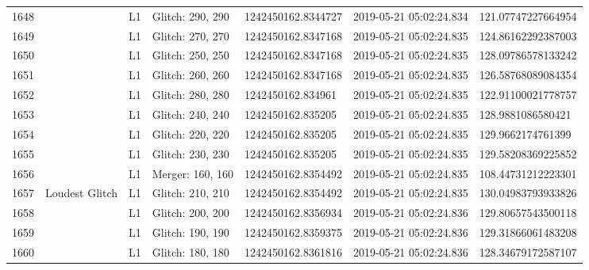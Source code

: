 \begin{longtable}{lllllll}
1648 &                                                    &       L1 &  Glitch: 290, 290 &  1242450162.8344727 &  2019-05-21 05:02:24.834 &  121.07747227664954 \\
1649 &                                                    &       L1 &  Glitch: 270, 270 &  1242450162.8347168 &  2019-05-21 05:02:24.835 &  124.86162292387003 \\
1650 &                                                    &       L1 &  Glitch: 250, 250 &  1242450162.8347168 &  2019-05-21 05:02:24.835 &  128.09786578133242 \\
1651 &                                                    &       L1 &  Glitch: 260, 260 &  1242450162.8347168 &  2019-05-21 05:02:24.835 &  126.58768089084354 \\
1652 &                                                    &       L1 &  Glitch: 280, 280 &   1242450162.834961 &  2019-05-21 05:02:24.835 &  122.91100021778757 \\
1653 &                                                    &       L1 &  Glitch: 240, 240 &   1242450162.835205 &  2019-05-21 05:02:24.835 &   128.9881086580421 \\
1654 &                                                    &       L1 &  Glitch: 220, 220 &   1242450162.835205 &  2019-05-21 05:02:24.835 &   129.9662174761399 \\
1655 &                                                    &       L1 &  Glitch: 230, 230 &   1242450162.835205 &  2019-05-21 05:02:24.835 &  129.58208369225852 \\
1656 &                                                    &       L1 &  Merger: 160, 160 &  1242450162.8354492 &  2019-05-21 05:02:24.835 &  108.44731212223301 \\
1657 &                                     Loudest Glitch &       L1 &  Glitch: 210, 210 &  1242450162.8354492 &  2019-05-21 05:02:24.835 &  130.04983793933826 \\
1658 &                                                    &       L1 &  Glitch: 200, 200 &  1242450162.8356934 &  2019-05-21 05:02:24.836 &  129.80657543500118 \\
1659 &                                                    &       L1 &  Glitch: 190, 190 &  1242450162.8359375 &  2019-05-21 05:02:24.836 &  129.31866061483208 \\
1660 &                                                    &       L1 &  Glitch: 180, 180 &  1242450162.8361816 &  2019-05-21 05:02:24.836 &  128.34679172587107 \\

\end{longtable}
